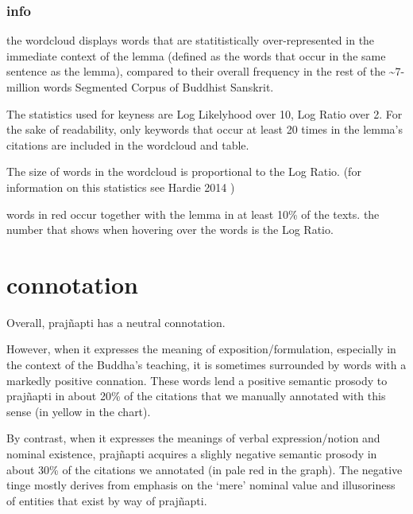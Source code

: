 \documentclass[
  letterpaper,
  DIV=11,
  numbers=noendperiod,
  oneside]{scrreprt}
\begin{document}
\hypertarget{info-1}{%
\subsubsection{info}\label{info-1}}

the wordcloud displays words that are statitistically over-represented
in the immediate context of the lemma (defined as the words that occur
in the same sentence as the lemma), compared to their overall frequency
in the rest of the \textasciitilde7-million words Segmented Corpus of
Buddhist Sanskrit.

The statistics used for keyness are Log Likelyhood over 10, Log Ratio
over 2. For the sake of readability, only keywords that occur at least
20 times in the lemma's citations are included in the wordcloud and
table.

The size of words in the wordcloud is proportional to the Log Ratio.
(for information on this statistics see Hardie 2014 )

words in red occur together with the lemma in at least 10\% of the
texts. the number that shows when hovering over the words is the Log
Ratio.

\hypertarget{sec-connotation}{%
\section{connotation}\label{sec-connotation}}

Overall, prajñapti has a neutral connotation.

However, when it expresses the meaning of exposition/formulation,
especially in the context of the Buddha's teaching, it is sometimes
surrounded by words with a markedly positive connation. These words lend
a positive semantic prosody to prajñapti in about 20\% of the citations
that we manually annotated with this sense (in yellow in the chart).

By contrast, when it expresses the meanings of verbal expression/notion
and nominal existence, prajñapti acquires a slighly negative semantic
prosody in about 30\% of the citations we annotated (in pale red in the
graph). The negative tinge mostly derives from emphasis on the `mere'
nominal value and illusoriness of entities that exist by way of
prajñapti.

\end{document}
